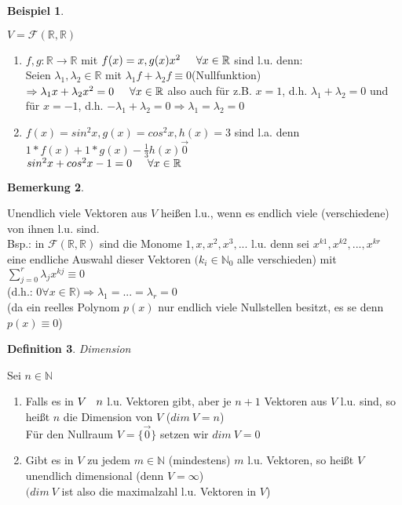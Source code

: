 \documentclass[a4paper,11pt]{article}
\newtheorem{definition}{Definition}[section]
\newtheorem{bsp}[definition]{Beispiel}
\newtheorem{bem}[definition]{Bemerkung}
\begin{document}
\newpage
\begin{bsp}
\end{bsp}
$V=\mathscr{F}(\mathbb{R},\mathbb{R})$
\begin{enumerate}[label=\alph*)]
\item $f,g\colon\mathbb{R}\rightarrow\mathbb{R}$ mit $f(x)=x, g(x)x^2\hspace{5mm}\forall x\in\mathbb{R}$ sind l.u. denn: \\
Seien $\lambda_1,\lambda_2\in\mathbb{R}$ mit $\lambda_1f+\lambda_2f\equiv0$\hspace{5mm}(Nullfunktion) \\
$\Rightarrow\lambda_1x+\lambda_2x^2=0\hspace{5mm}\forall x\in\mathbb{R}$ also auch für z.B. $x=1$, d.h. $\lambda_1+\lambda_2=0$ und für $x=-1$, d.h. $-\lambda_1+\lambda_2=0\Rightarrow\lambda_1=\lambda_2=0$
\item $f(x)=sin^2x, g(x)=cos^2x, h(x)=3$ sind l.a. denn \\
$1*f(x)+1*g(x)-\frac{1}{3}h(x)\overset{\rightarrow}{0}$ \\
$sin^2x+cos^2x-1=0\hspace{5mm}\forall x\in\mathbb{R}$
\end{enumerate}
\begin{bem}
\end{bem}
Unendlich viele Vektoren aus $V$ heißen l.u., wenn es endlich viele (verschiedene) von ihnen l.u. sind. \\
Bsp.: in $\mathscr{F}(\mathbb{R},\mathbb{R})$ sind die Monome $1,x,x^2,x^3,...$ l.u. denn sei $x^{k1}, x^{k2},...,x^{kr}$ eine endliche Auswahl dieser Vektoren $(k_i\in\mathbb{N}_0$ alle verschieden) mit $\sum^r_{j=0}\lambda_jx^{kj}\equiv0$\\
(d.h.: 0\hspace{5mm}$\forall x\in\mathbb{R})\Rightarrow\lambda_1=...=\lambda_r=0$ \\
(da ein reelles Polynom $p(x)$ nur endlich viele Nullstellen besitzt, es se denn $p(x)\equiv0$)
\begin{definition}
Dimension
\end{definition}
Sei $n\in\mathbb{N}$
\begin{enumerate}[label=\alph*)]
\item Falls es in $V\hspace{3mm}n$ l.u. Vektoren gibt, aber je $n+1$ Vektoren aus $V$ l.u. sind, so heißt $n$ die Dimension von $V$ ($dim\:V=n$)\\
Für den Nullraum $V=\{\overset{\rightarrow}{0}\}$ setzen wir $dim\:V=0$
\item Gibt es in $V$ zu jedem $m\in\mathbb{N}$ (mindestens) $m$ l.u. Vektoren, so heißt $V$ unendlich dimensional (denn $V=\infty$) \\
$(dim\:V$ ist also die maximalzahl l.u. Vektoren in $V$)
\end{enumerate}
\end{document}

